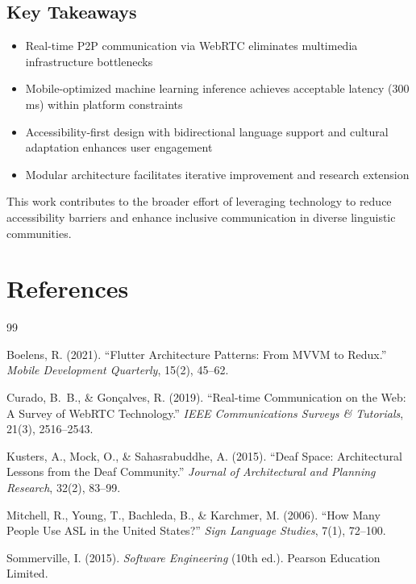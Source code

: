 \documentclass[11pt,a4paper,twoside]{report}
\begin{document}
\subsection*{Key Takeaways}

\begin{itemize}
    \item Real-time P2P communication via WebRTC eliminates multimedia infrastructure bottlenecks
    \item Mobile-optimized machine learning inference achieves acceptable latency (300 ms) within platform constraints
    \item Accessibility-first design with bidirectional language support and cultural adaptation enhances user engagement
    \item Modular architecture facilitates iterative improvement and research extension
\end{itemize}

This work contributes to the broader effort of leveraging technology to reduce accessibility barriers and enhance inclusive communication in diverse linguistic communities.

\newpage

\section*{References}

\begin{thebibliography}{99}

 Boelens, R. (2021).
``Flutter Architecture Patterns: From MVVM to Redux.''
\textit{Mobile Development Quarterly}, 15(2), 45--62.

 Curado, B.~B., \& Gonçalves, R. (2019).
``Real-time Communication on the Web: A Survey of WebRTC Technology.''
\textit{IEEE Communications Surveys \& Tutorials}, 21(3), 2516--2543.

 Kusters, A., Mock, O., \& Sahasrabuddhe, A. (2015).
``Deaf Space: Architectural Lessons from the Deaf Community.''
\textit{Journal of Architectural and Planning Research}, 32(2), 83--99.

 Mitchell, R., Young, T., Bachleda, B., \& Karchmer, M. (2006).
``How Many People Use ASL in the United States?''
\textit{Sign Language Studies}, 7(1), 72--100.

 Sommerville, I. (2015).
\textit{Software Engineering} (10th ed.). 
Pearson Education Limited.

\end{thebibliography}
\end{document}
